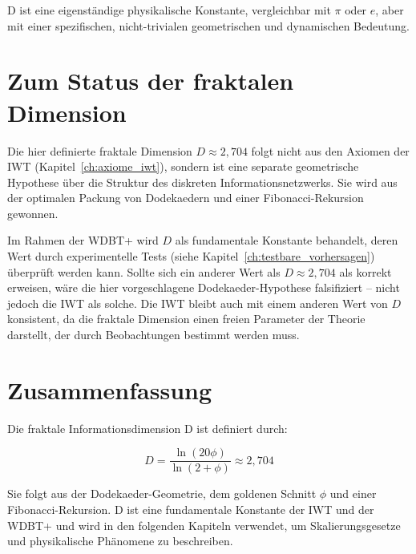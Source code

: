 D ist eine eigenständige physikalische Konstante, vergleichbar mit \( \pi \) oder \( e \), aber mit einer spezifischen, nicht-trivialen geometrischen und dynamischen Bedeutung.

\section{Zum Status der fraktalen Dimension}
\label{sec:d_status}

Die hier definierte fraktale Dimension \( D \approx 2,704 \) folgt nicht aus den Axiomen der IWT (Kapitel~\ref{ch:axiome_iwt}), sondern ist eine separate geometrische Hypothese über die Struktur des diskreten Informationsnetzwerks. Sie wird aus der optimalen Packung von Dodekaedern und einer Fibonacci-Rekursion gewonnen.

Im Rahmen der WDBT+ wird \( D \) als fundamentale Konstante behandelt, deren Wert durch experimentelle Tests (siehe Kapitel~\ref{ch:testbare_vorhersagen}) überprüft werden kann. Sollte sich ein anderer Wert als \( D \approx 2,704 \) als korrekt erweisen, wäre die hier vorgeschlagene Dodekaeder-Hypothese falsifiziert – nicht jedoch die IWT als solche. Die IWT bleibt auch mit einem anderen Wert von \( D \) konsistent, da die fraktale Dimension einen freien Parameter der Theorie darstellt, der durch Beobachtungen bestimmt werden muss.

\section{Zusammenfassung}
\label{sec:d_zusammenfassung}

Die fraktale Informationsdimension D ist definiert durch:

\[
D = \frac{\ln(20\phi)}{\ln(2 + \phi)} \approx 2,704
\]

Sie folgt aus der Dodekaeder-Geometrie, dem goldenen Schnitt \( \phi \) und einer Fibonacci-Rekursion. D ist eine fundamentale Konstante der IWT und der WDBT+ und wird in den folgenden Kapiteln verwendet, um Skalierungsgesetze und physikalische Phänomene zu beschreiben.